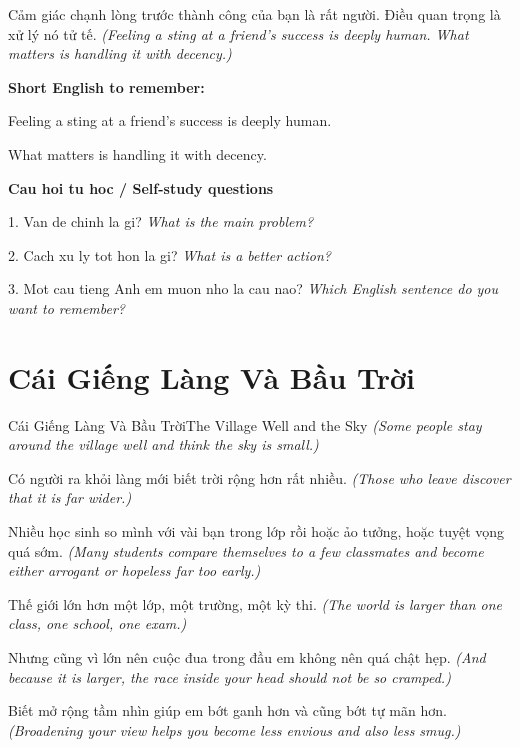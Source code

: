 \begin{baihoc}
Cảm giác chạnh lòng trước thành công của bạn là rất người. Điều quan trọng là xử lý nó tử tế.
\textit{(Feeling a sting at a friend’s success is deeply human. What matters is handling it with decency.)}
\end{baihoc}

\begin{ghinhoanh}
\textbf{Short English to remember:}

Feeling a sting at a friend’s success is deeply human.

What matters is handling it with decency.

\end{ghinhoanh}

\begin{tuhocnhanh}
\textbf{Cau hoi tu hoc / Self-study questions}

1. Van de chinh la gi? \textit{What is the main problem?}

2. Cach xu ly tot hon la gi? \textit{What is a better action?}

3. Mot cau tieng Anh em muon nho la cau nao? \textit{Which English sentence do you want to remember?}
\end{tuhocnhanh}
\ngancach

\section{Cái Giếng Làng Và Bầu Trời}
\begin{truyen}{Cái Giếng Làng Và Bầu Trời}{The Village Well and the Sky}
\textit{(Some people stay around the village well and think the sky is small.)}

Có người ra khỏi làng mới biết trời rộng hơn rất nhiều.
\textit{(Those who leave discover that it is far wider.)}

Nhiều học sinh so mình với vài bạn trong lớp rồi hoặc ảo tưởng, hoặc tuyệt vọng quá sớm.
\textit{(Many students compare themselves to a few classmates and become either arrogant or hopeless far too early.)}

Thế giới lớn hơn một lớp, một trường, một kỳ thi.
\textit{(The world is larger than one class, one school, one exam.)}

Nhưng cũng vì lớn nên cuộc đua trong đầu em không nên quá chật hẹp.
\textit{(And because it is larger, the race inside your head should not be so cramped.)}

Biết mở rộng tầm nhìn giúp em bớt ganh hơn và cũng bớt tự mãn hơn.
\textit{(Broadening your view helps you become less envious and also less smug.)}

\end{truyen}


